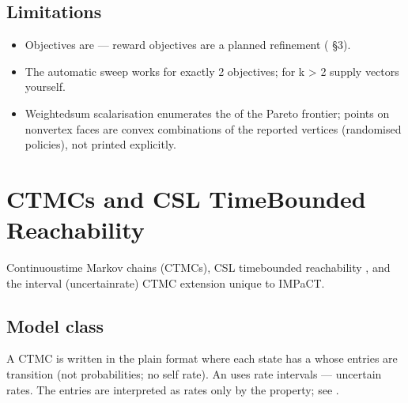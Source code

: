 \documentclass[a4paper,10pt,english]{sphinxmanual}
\begin{document}
\subsection{Limitations}
\label{\detokenize{manual/multiobjective:limitations}}\begin{itemize}
\item {} 
\sphinxAtStartPar
Objectives are  — reward objectives are a planned
refinement ( \S{}3).

\item {} 
\sphinxAtStartPar
The automatic sweep works for exactly 2 objectives; for k \textgreater{} 2 supply 
vectors yourself.

\item {} 
\sphinxAtStartPar
Weighted\sphinxhyphen{}sum scalarisation enumerates the  of the Pareto frontier;
points on non\sphinxhyphen{}vertex faces are convex combinations of the reported vertices
(randomised policies), not printed explicitly.

\end{itemize}

\sphinxstepscope


\section{CTMCs and CSL Time\sphinxhyphen{}Bounded Reachability}
\label{\detokenize{manual/ctmc-csl:ctmcs-and-csl-time-bounded-reachability}}\label{\detokenize{manual/ctmc-csl::doc}}
\sphinxAtStartPar
Continuous\sphinxhyphen{}time Markov chains (CTMCs), CSL time\sphinxhyphen{}bounded reachability ,
and the interval (uncertain\sphinxhyphen{}rate) CTMC extension unique to IMPaCT.


\subsection{Model class}
\label{\detokenize{manual/ctmc-csl:model-class}}
\sphinxAtStartPar
A CTMC is written in the plain  format where each state has a 
whose entries  are transition  (not probabilities; no self rate). An
 uses rate intervals  — uncertain rates. The entries are
interpreted as rates only by the  property; see {\hyperref[\detokenize{manual/formats::doc}]{}}.
\end{document}
